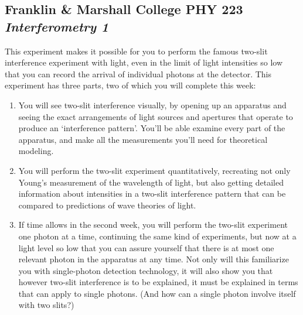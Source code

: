 \documentclass[11pt]{article}
\begin{document}
\begin{center}
\section*{
Franklin \& Marshall College \hfill PHY 223\\
\bigskip
{\Large \it Interferometry 1}}
\end{center}
 
This experiment makes it possible for you to perform the famous two-slit
interference experiment with light, even in the limit of light intensities so
low that you can record the arrival of individual photons at the detector. This 
experiment has three parts, two of which you will 
complete this week:\vspace{2mm}

\begin{enumerate}
\item You will see two-slit interference visually, by opening up an
apparatus and seeing the exact arrangements of light sources and apertures that
operate to produce an ‘interference pattern’. You’ll be able examine every part
of the apparatus, and make all the measurements you’ll need for theoretical
modeling.

\item You will perform the two-slit experiment quantitatively,
recreating not only Young’s measurement of the wavelength of light, but also
getting detailed information about intensities in a two-slit interference
pattern that can be compared to predictions of wave theories of light.

\item If time allows in the second week, you will perform the two-slit experiment one photon at a time,
continuing the same kind of experiments, but now at a light level so low that
you can assure yourself that there is at most one relevant photon in the
apparatus at any time. Not only will this familiarize you with single-photon
detection technology, it will also show you that however two-slit interference
is to be explained, it must be explained in terms that can apply to single
photons. (And how can a single photon involve itself with two slits?)
\end{enumerate}



\vspace{2mm}
\end{document}
